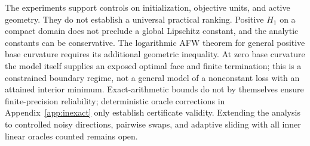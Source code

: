 \documentclass[a4paper,11pt]{article}
\begin{document}
The experiments support controls on initialization, objective units,
and active geometry. They do not establish a universal practical
ranking. Positive $H_1$ on a compact domain does not preclude a global
Lipschitz constant, and the analytic constants can be conservative.
The logarithmic AFW theorem for general positive base curvature requires
its additional geometric inequality. At zero base curvature the model
itself supplies an exposed optimal face and finite termination;
this is a constrained boundary regime, not a general model of a
nonconstant loss with an attained interior minimum.
Exact-arithmetic bounds do not by themselves ensure
finite-precision reliability; deterministic oracle corrections in
Appendix~\ref{app:inexact} only establish certificate validity.
Extending the analysis to controlled noisy directions, pairwise swaps,
and adaptive sliding with all inner linear oracles counted remains open.


\appendix

\end{document}
